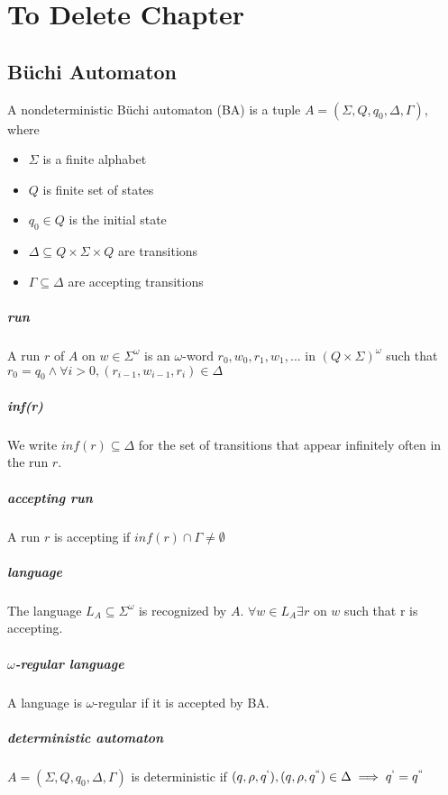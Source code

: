\documentclass[
	digital
nolof, nolot
]{fithesis3}
\begin{document}
		
	\chapter{To Delete Chapter}
		\section{Büchi Automaton}
		A nondeterministic Büchi automaton (BA) is a tuple 
		$A=(\Sigma, Q, q_0, \Delta, \Gamma)$,
		where
		\begin{itemize}
			\item $\Sigma$ is a finite alphabet
			\item $Q$ is finite set of states
			\item $q_0 \in Q$ is the initial state
			\item $\Delta \subseteq Q \times \Sigma \times Q$
			are transitions
			\item $\Gamma \subseteq \Delta$
			are accepting transitions
		\end{itemize} 
		\paragraph{run}
		A run $r$ of $A$ on $w \in \Sigma^\omega$
		is an $\omega$-word $r_0, w_0, r_1, w_1,...$ in $(Q\times\Sigma)^\omega$
		such that $r_0 = q_0 \land\forall i>0, (r_{i-1}, w_{i-1}, r_i) \in \Delta$ 
		\paragraph{inf(r)}
		We write $inf(r) \subseteq \Delta$ for the set of transitions that appear infinitely often in the run $r$.
		\paragraph{accepting run} A run $r$ is accepting if $inf(r) \cap \Gamma \neq \emptyset$
		\paragraph{language}
		The language $L_A\subseteq\Sigma^\omega$ is recognized by $A$.\newline
		$\forall w \in L_A \exists r$ on $w$ such that r is accepting.
		\paragraph{$\omega$-regular language}
		A language is $\omega$-regular if it is accepted by BA.
		\paragraph{deterministic automaton}
		$A=(\Sigma, Q, q_0, \Delta, \Gamma)$ is deterministic if \newline$(q, \rho, q^`), (q, \rho, q^{``})\in\Delta\implies q^`=q^{``}$
\end{document}
